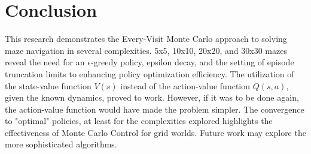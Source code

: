 \documentclass[letterpaper]{article} %
\begin{document}
\section{Conclusion}
This research demonstrates the Every-Visit Monte Carlo approach to solving maze navigation in several complexities. 5x5, 10x10, 20x20, and 30x30 mazes reveal the need for an $\epsilon$-greedy policy, epsilon decay, and the setting of episode truncation limits to enhancing policy optimization efficiency. The utilization of the state-value function $V(s)$ instead of the action-value function $Q(s,a)$, given the known dynamics, proved to work. However, if it was to be done again, the action-value function would have made the problem simpler. The convergence to "optimal" policies, at least for the complexities explored highlights the effectiveness of Monte Carlo Control for grid worlds. Future work may explore the more sophisticated algorithms.


\end{document}

